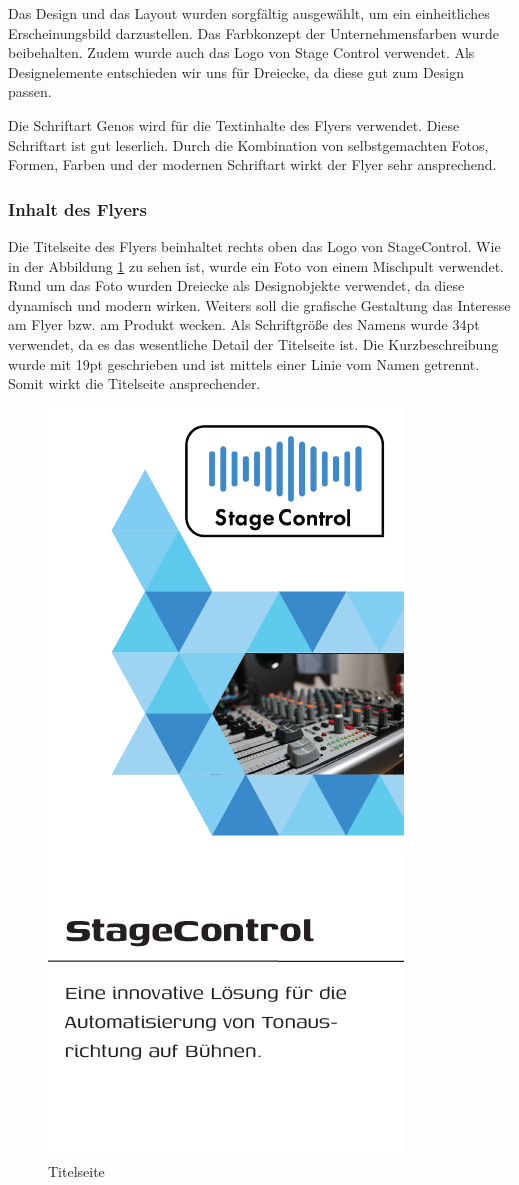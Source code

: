 Das Design und das Layout wurden sorgfältig ausgewählt, um ein einheitliches Erscheinungsbild darzustellen. Das Farbkonzept der Unternehmensfarben wurde beibehalten. Zudem wurde auch das Logo von Stage Control verwendet. Als Designelemente entschieden wir uns für Dreiecke, da diese gut zum Design passen. 

Die Schriftart Genos wird für die Textinhalte des Flyers verwendet. Diese Schriftart ist gut leserlich. Durch die Kombination von selbstgemachten Fotos, Formen, Farben und der modernen Schriftart wirkt der Flyer sehr ansprechend. 

\newpage
\subsubsection{Inhalt des Flyers}
Die Titelseite des Flyers beinhaltet rechts oben das Logo von StageControl. Wie in der Abbildung \ref{fig:Titelseite} zu sehen ist, wurde ein Foto von einem Mischpult verwendet. Rund um das Foto wurden Dreiecke als Designobjekte verwendet, da diese dynamisch und modern wirken. Weiters soll die grafische Gestaltung das Interesse am Flyer bzw. am Produkt wecken. 
Als Schriftgröße des Namens wurde 34pt verwendet, da es das wesentliche Detail der Titelseite ist. Die Kurzbeschreibung wurde mit 19pt geschrieben und ist mittels einer Linie vom Namen getrennt. Somit wirkt die Titelseite ansprechender.

\begin{figure}[H]
	\centering
	\includegraphics[width=0.4\linewidth]{images/Titelseite.png}
	\caption[Titelseite]{Titelseite}
	\label{fig:Titelseite}
\end{figure}

